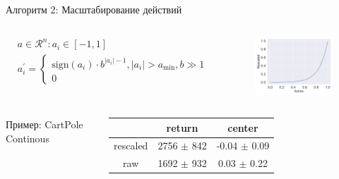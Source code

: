 \begin{frame}{Алгоритм 2: Масштабирование действий}

\begin{minipage}{\linewidth}
\begin{columns}
\begin{align*}
& a \in \mathcal{R}^n: a_i \in [-1, 1] \\
& a_i^{\prime} =
   \begin{cases}
    {\mathrm{sign}}(a_i) \cdot b^{|a_i| - 1}, |a_i| > a_{\min}, b \gg 1
    \\
    0
  \end{cases}
\end{align*}

\begin{figure}
    \centering
    \includegraphics[width=1\linewidth]{images/rescale.pdf}
\end{figure}

\end{columns}

\end{minipage}
\begin{minipage}{\linewidth}
\begin{columns}
    Пример: CartPole Continous
    \begin{tabular}{c|c|c}
         & return & center \\ 
         \hline
         rescaled &  2756 $\pm$ 842 & -0.04 $\pm$ 0.09\\
         raw & 1692 $\pm$ 932 & 0.03 $\pm$ 0.22 
    \end{tabular}


\end{columns}
\end{minipage}
\end{frame}
